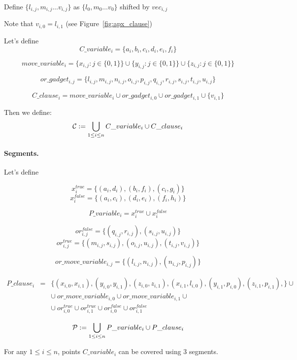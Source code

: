 	
	
	Define 
	$\{ l_{i, j}, m_{i, j} \ldots v_{i, j} \}$
	as $\{l_0, m_0 \ldots v_0\}$ shifted by $vec_{i, j}$

Note that $v_{i, 0} = l_{i, 1}$ (see Figure~\ref{fig:apx_clause})

Let's define $$C\_variable_i =  \{a_i, b_i, c_i, d_i, e_i, f_i\}$$	
 
 $$move\_variable_i = 
 \{x_{i, j} : j \in \{0, 1\}\} \cup
 \{y_{i, j} : j \in \{0, 1\}\} \cup
 \{z_{i, j} : j \in \{0, 1\}\} 
 $$
 
 $$or\_gadget_{i, j} = 
 \{l_{i, j}, m_{i, j}, n_{i, j}, o_{i, j},
 p_{i, j}, q_{i, j}, r_{i, j}, s_{i, j}, t_{i, j}, u_{i, j} \}
 $$
 
 $$C\_clause_i = 
 move\_variable_i \cup or\_gadget_{i, 0}
 \cup or\_gadget_{i, 1} \cup \{v_{i, 1} \} 
 $$
 

Then we define:
$$\mathcal{C} := \bigcup_{1 \le i \le n} C\_variable_i \cup C\_clause_i $$


\paragraph{Segments.}

Let's define 

$$x^{true}_i =\{ (a_i, d_i), (b_i, f_i), (c_i, g_i)\}$$
$$x^{false}_i = \{(a_i, c_i), (d_i, e_i), (f_i, h_i)\}$$

$$P\_variable_i = x^{true}_i \cup x^{false}_i$$

$$or^{false}_{i, j} =
\{ (q_{i, j}, r_{i, j}), (s_{i, j}, u_{i, j})\}$$
$$or^{true}_{i, j} =
\{ (m_{i, j}, s_{i, j}), (o_{i, j}, u_{i, j}),
(t_{i, j}, v_{i, j}) \}$$

$$or\_move\_variable_{i, j} =
\{ (l_{i, j}, n_{i, j}), (n_{i, j}, p_{i, j})\}$$

\begin{eqnarray*}
P\_clause_i & = & \{ (x_{i, 0}, x_{i, 1}),
(y_{i, 0}, y_{i, 1}),
(z_{i, 0}, z_{i, 1}),
(x_{i, 1}, l_{i, 0}),
(y_{i, 1}, p_{i, 0}),
(z_{i, 1}, p_{i, 1}),
\} \cup \\
& & \cup \ or\_move\_variable_{i, 0} \cup or\_move\_variable_{i, 1} \cup \\
& & \cup \ or^{true}_{i, 0} \cup or^{true}_{i, 1} 
\cup or^{false}_{i, 0} \cup or^{false}_{i, 1}
\end{eqnarray*}

$$\mathcal{P} := \bigcup_{1 \le i \le n} P\_variable_i \cup P\_clause_i $$

\begin{lemma}
\label{choose_variables_solution}
For any $1 \le i \le n$, points $C\_variable_i$
can be covered using 3 segments.
\end{lemma}

